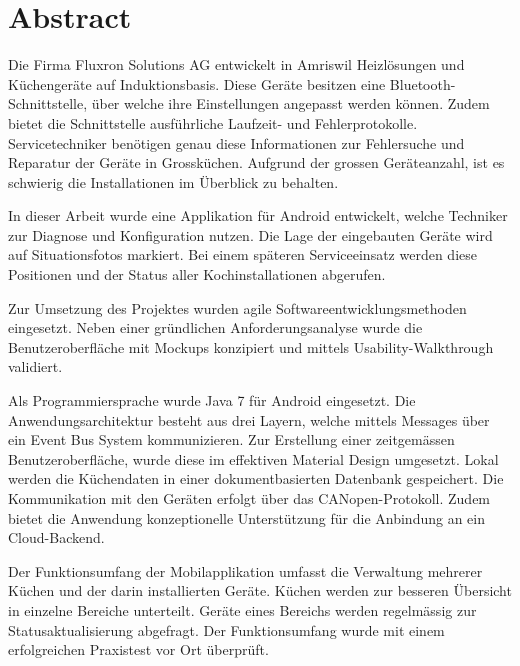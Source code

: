 
\chapter*{Abstract}

Die Firma Fluxron Solutions AG entwickelt in Amriswil Heizlösungen und Küchengeräte auf Induktionsbasis. Diese Geräte besitzen eine Bluetooth-Schnittstelle, über welche ihre Einstellungen angepasst werden können. Zudem bietet die Schnittstelle ausführliche Laufzeit- und Fehlerprotokolle. Servicetechniker benötigen genau diese Informationen zur Fehlersuche und Reparatur der Geräte in Grossküchen. Aufgrund der grossen Geräteanzahl, ist es schwierig die Installationen im Überblick zu behalten.

In dieser Arbeit wurde eine Applikation für Android entwickelt, welche Techniker zur Diagnose und Konfiguration nutzen. Die Lage der eingebauten Geräte wird auf Situationsfotos markiert. Bei einem späteren Serviceeinsatz werden diese Positionen und der Status aller Kochinstallationen abgerufen.

Zur Umsetzung des Projektes wurden agile Softwareentwicklungsmethoden eingesetzt. Neben einer gründlichen Anforderungsanalyse wurde die Benutzeroberfläche mit Mockups konzipiert und mittels Usability-Walkthrough validiert.

Als Programmiersprache wurde Java 7 für Android eingesetzt. Die Anwendungsarchitektur besteht aus drei Layern, welche mittels Messages über ein Event Bus System kommunizieren. Zur Erstellung einer zeitgemässen Benutzeroberfläche, wurde diese im effektiven Material Design umgesetzt. Lokal werden die Küchendaten in einer dokumentbasierten Datenbank gespeichert. Die Kommunikation mit den Geräten erfolgt über das CANopen-Protokoll. Zudem bietet die Anwendung konzeptionelle Unterstützung für die Anbindung an ein Cloud-Backend.

Der Funktionsumfang der Mobilapplikation umfasst die Verwaltung mehrerer Küchen und der darin installierten Geräte. Küchen werden zur besseren Übersicht in einzelne Bereiche unterteilt. Geräte eines Bereichs werden regelmässig zur Statusaktualisierung abgefragt. Der Funktionsumfang wurde mit einem erfolgreichen Praxistest vor Ort überprüft. 